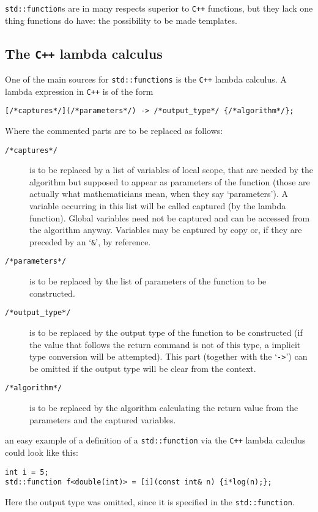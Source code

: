 \documentclass{article}
\newcommand{\cc}{\texttt{C++}\xspace}
\newcommand{\code}[1]{\texttt{#1}}
\begin{document}
\code{std::function}s are in many respects superior to \cc functions, but they lack one thing functions do have: the possibility to be made templates.


\subsection{The \cc lambda calculus}\label{sec: The cc lambda calculus}

One of the main sources for \code{std::functions} is the \cc lambda calculus. A lambda expression in \cc is of the form
\begin{lstlisting}
[/*captures*/](/*parameters*/) -> /*output_type*/ {/*algorithm*/};
\end{lstlisting}
Where the commented parts are to be replaced as follows:
\begin{description}
\item[\textcolor{commentgray}{\code{/*captures*/}}] is to be replaced by a list of variables of local scope, that are needed by the algorithm but supposed to appear as parameters of the function (those are actually what mathematicians mean, when they say \lq parameters\rq). A variable occurring in this list will be called captured (by the lambda function). Global variables need not be captured and can be accessed from the algorithm anyway. Variables may be captured by copy or, if they are preceded by an \lq\code{\&}\rq, by reference.
\item[\textcolor{commentgray}{\code{/*parameters*/}}] is to be replaced by the list of parameters of the function to be constructed.
\item[\textcolor{commentgray}{\code{/*output\_type*/}}] is to be replaced by the output type of the function to be constructed (if the value that follows the return command is not of this type, a implicit type conversion will be attempted). This part (together with the \lq\code{->}\rq) can be omitted if the output type will be clear from the context.
\item[\textcolor{commentgray}{\code{/*algorithm*/}}] is to be replaced by the algorithm calculating the return value from the parameters and the captured variables.
\end{description}
an easy example of a definition of a \code{std::function} via the \cc lambda calculus could look like this:
\begin{lstlisting}
int i = 5;
std::function f<double(int)> = [i](const int& n) {i*log(n);};
\end{lstlisting}
Here the output type was omitted, since it is specified in the \code{std::function}.
\end{document}
